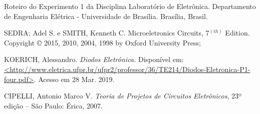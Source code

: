 \documentclass[10pt, final, a4paper]{IEEEtran} %
\begin{document}
\begin{thebibliography}{9}

	 Roteiro do Experimento 1 da Disciplina Laboratório de Eletrônica. Departamento de Engenharia Elétrica - Universidade de Brasília. Brasília, Brasil.

     SEDRA; Adel S. e SMITH, Kenneth C. Microeletronics Circuits, 7$^(th)$ Edition. Copyright © 2015, 2010, 2004, 1998 by Oxford University Press;
	
	KOERICH, Alessandro. \emph{Diodos Eletrônica.} Disponível em: \sloppy
	\url{<http://www.eletrica.ufpr.br/ufpr2/professor/36/TE214/Diodos-Eletronica-P1-four.pdf>}. Acesso em 28 Mar. 2019.
	
	CIPELLI, Antonio Marco V. \emph{Teoria de Projetos de Circuitos Eletrônicos}, 23º edição – São Paulo: Érica, 2007.

\end{thebibliography}
\end{document}

